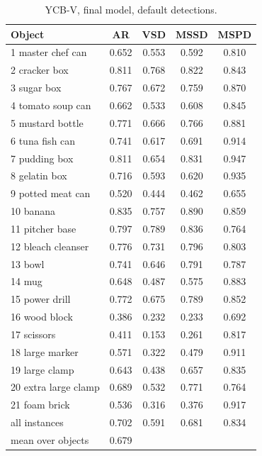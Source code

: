 \begin{table}[h]
  \centering
  \footnotesize
  \begin{tabular}{lcccc}
    \toprule
    Object & AR & VSD & MSSD & MSPD \\
    \midrule
1 master chef can & 0.652 & 0.553 & 0.592 & 0.810 \\
2 cracker box & 0.811 & 0.768 & 0.822 & 0.843 \\
3 sugar box & 0.767 & 0.672 & 0.759 & 0.870 \\
4 tomato soup can & 0.662 & 0.533 & 0.608 & 0.845 \\
5 mustard bottle & 0.771 & 0.666 & 0.766 & 0.881 \\
6 tuna fish can & 0.741 & 0.617 & 0.691 & 0.914 \\
7 pudding box & 0.811 & 0.654 & 0.831 & 0.947 \\
8 gelatin box & 0.716 & 0.593 & 0.620 & 0.935 \\
9 potted meat can & 0.520 & 0.444 & 0.462 & 0.655 \\
10 banana & 0.835 & 0.757 & 0.890 & 0.859 \\
11 pitcher base & 0.797 & 0.789 & 0.836 & 0.764 \\
12 bleach cleanser & 0.776 & 0.731 & 0.796 & 0.803 \\
13 bowl & 0.741 & 0.646 & 0.791 & 0.787 \\
14 mug & 0.648 & 0.487 & 0.575 & 0.883 \\
15 power drill & 0.772 & 0.675 & 0.789 & 0.852 \\
16 wood block & 0.386 & 0.232 & 0.233 & 0.692 \\
17 scissors & 0.411 & 0.153 & 0.261 & 0.817 \\
18 large marker & 0.571 & 0.322 & 0.479 & 0.911 \\
19 large clamp & 0.643 & 0.438 & 0.657 & 0.835 \\
20 extra large clamp & 0.689 & 0.532 & 0.771 & 0.764 \\
21 foam brick & 0.536 & 0.316 & 0.376 & 0.917 \\
\midrule
all instances & 0.702 & 0.591 & 0.681 & 0.834 \\
mean over objects & 0.679 &  &  &  \\
    \bottomrule
  \end{tabular}
  \caption{YCB-V, final model, default detections.}
  \label{tab:perobj_ycbv}
\end{table}
